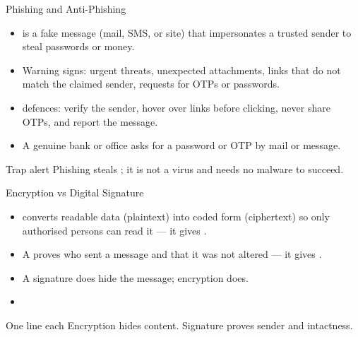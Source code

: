 \documentclass[aspectratio=169]{beamer}
\begin{document}
\begin{frame}{Phishing and Anti-Phishing}
  \begin{itemize}
    \item {} is a fake message (mail, SMS, or site) that
      impersonates a trusted sender to steal passwords or money.
    \item Warning signs: urgent threats, unexpected attachments, links that
      do not match the claimed sender, requests for OTPs or passwords.
    \item {} defences: verify the sender, hover over links
      before clicking, never share OTPs, and report the message.
    \item A genuine bank or office  asks for a password or OTP
      by mail or message.
  \end{itemize}
  \begin{alertblock}{Trap alert}
    Phishing steals ; it is not a virus and
    needs no malware to succeed.
  \end{alertblock}
\end{frame}

\begin{frame}{Encryption vs Digital Signature}
  \begin{itemize}
    \item {} converts readable data (plaintext) into coded
      form (ciphertext) so only authorised persons can read it ---
      it gives .
    \item A  proves who sent a message and that it
      was not altered --- it gives .
    \item A signature does  hide the message; encryption does.
    \item {}
  \end{itemize}
  \begin{block}{One line each}
    Encryption hides content. Signature proves sender and intactness.
  \end{block}
\end{frame}
\end{document}

